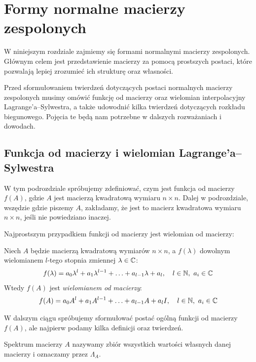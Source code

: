 \chapter{Formy normalne macierzy zespolonych}

W niniejszym rozdziale zajmiemy się formami normalnymi macierzy zespolonych. Głównym celem jest przedstawienie macierzy za pomocą prostszych postaci, które pozwalają lepiej zrozumieć ich strukturę oraz własności.

Przed sformułowaniem twierdzeń dotyczących postaci normalnych macierzy zespolonych musimy omówić funkcję od macierzy oraz wielomian interpolacyjny Lagrange'a--Sylwestra, a także udowodnić kilka twierdzeń dotyczących rozkładu biegunowego. Pojęcia te będą nam potrzebne w dalszych rozważaniach i dowodach.

\section{Funkcja od macierzy i wielomian Lagrange'a--Sylwestra}
W tym podrozdziale spróbujemy zdefiniować, czym jest funkcja od macierzy $f(A)$, gdzie $A$ jest macierzą kwadratową wymiaru $n \times n$. Dalej w podrozdziale, wszędzie gdzie piszemy $A$, zakładamy, że jest to macierz kwadratowa wymiaru $n \times n$, jeśli nie powiedziano inaczej.

Najprostszym przypadkiem funkcji od macierzy jest wielomian od macierzy:
\begin{definition}
    Niech $A$ będzie macierzą kwadratową wymiarów $n \times n$, a $f(\lambda)$ dowolnym wielomianem $l$-tego stopnia zmiennej $\lambda \in \mathbb{C}$:
    $$f(\lambda) = a_0\lambda^{l} + a_1\lambda^{l - 1} + \ldots + a_{l - 1}\lambda + a_l, \quad l \in \mathbb{N}, \ a_i \in \mathbb{C}$$
    Wtedy $f(A)$ jest \textit{wielomianem od macierzy}:
    $$f(A) = a_0A^{l} + a_1A^{l - 1} + \ldots + a_{l - 1}A + a_lI, \quad l \in \mathbb{N}, \ a_i \in \mathbb{C}$$
\end{definition}
W dalszym ciągu spróbujemy sformułować postać ogólną funkcji od macierzy $f(A)$, ale najpierw podamy kilka definicji oraz twierdzeń. 
\begin{definition}\label{def:matrix_spectrum}
    Spektrum macierzy $A$ nazywamy zbiór wszystkich wartości własnych danej macierzy i oznaczamy przez $\Lambda_{A}$.
\end{definition}

